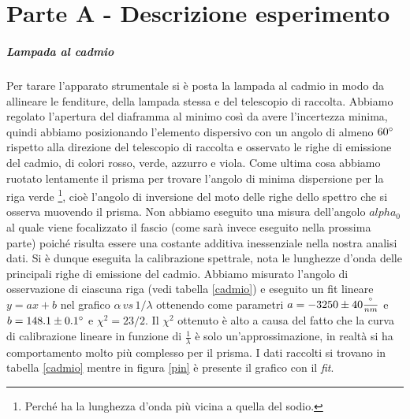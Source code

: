 \documentclass[10pt,a4paper]{article}
\begin{document}
\section{Parte A - Descrizione esperimento}
\subparagraph{Lampada al cadmio}
Per tarare l'apparato strumentale si è posta la lampada al cadmio in modo da allineare le fenditure, della lampada stessa e del telescopio di raccolta. Abbiamo regolato l'apertura del diaframma al minimo così da avere l'incertezza minima, quindi abbiamo posizionando l'elemento dispersivo con un angolo di almeno $60\degree$ rispetto alla direzione del telescopio di raccolta e osservato le righe di emissione del cadmio, di colori rosso, verde, azzurro e viola. Come ultima cosa abbiamo ruotato lentamente il prisma per trovare l'angolo di minima dispersione per la riga verde \footnote{Perché ha la lunghezza d'onda più vicina a quella del sodio.}, cioè l'angolo di inversione del moto delle righe dello spettro che si osserva muovendo il prisma. Non abbiamo eseguito una misura dell'angolo $alpha_0$ al quale viene focalizzato il fascio (come sarà invece eseguito nella prossima parte) poiché risulta essere una costante additiva inessenziale nella nostra analisi dati.
Si è dunque eseguita la calibrazione spettrale, nota le lunghezze d'onda delle principali righe di emissione del cadmio. Abbiamo misurato l'angolo di osservazione di ciascuna riga (vedi tabella \ref{cadmio}) e eseguito un fit lineare $y=ax+b$ nel grafico $\alpha\, \textit{vs}\, 1/\lambda$ ottenendo come parametri $a = -3250 \pm 40 \frac{\degree}{nm}$ e $ b = 148.1 \pm 0.1 \degree$ e $\chi^2=23/2$. Il $\chi^2$ ottenuto è alto a causa del fatto che la curva di calibrazione lineare in funzione di $\frac{1}{\lambda}$ è solo un'approssimazione, in realtà si ha comportamento molto più complesso per il prisma. I dati raccolti si trovano in tabella \ref{cadmio} mentre in figura \ref{pin} è presente il grafico con il \emph{fit}.
\end{document}
